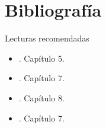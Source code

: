 \documentclass[9pt, aspectratio=169]{beamer}
\begin{document}
\section*{Bibliografía}
\begin{frame}{Lecturas recomendadas}
\begin{itemize}
    \item {}. Capítulo 5.
    \item {}. Capítulo 7.
    \item {}. Capítulo 8.
    \item {}. Capítulo 7.
\end{itemize}
\end{frame}
\end{document}

